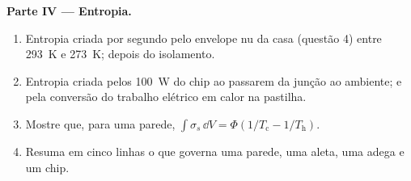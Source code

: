 \begin{problem}
\textbf{Parte IV --- Entropia.}
\begin{enumerate}[resume]
  \item Entropia criada por segundo pelo envelope nu da casa
        (questão 4) entre \qty{293}{K} e \qty{273}{K}; depois do
        isolamento.
  \item Entropia criada pelos \qty{100}{W} do chip ao passarem da
        junção ao ambiente; e pela conversão do trabalho elétrico
        em calor na pastilha.
  \item Mostre que, para uma parede, $\int\sigma_s\,\dd V = \Phi(1/T_{\text{c}} -
        1/T_{\text{h}})$.
  \item Resuma em cinco linhas o que governa uma parede, uma aleta, uma adega
        e um chip.
\end{enumerate}
\end{problem}
